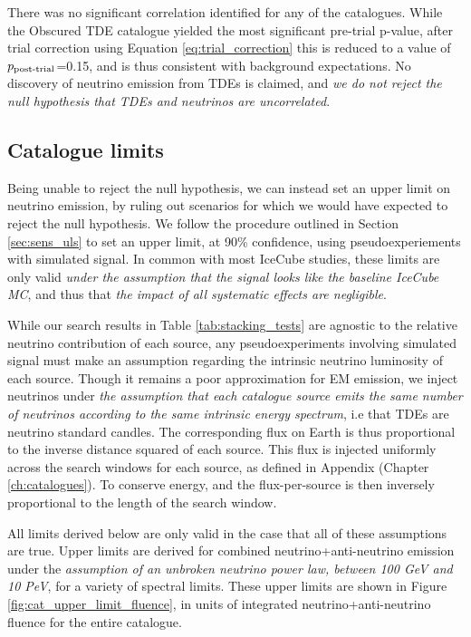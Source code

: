 There was no significant correlation identified for any of the catalogues. While the Obscured TDE catalogue yielded the most significant pre-trial p-value, after trial correction using Equation \ref{eq:trial_correction} this is reduced to a value of $p_{\textup{post-trial}}$=0.15, and is thus consistent with background expectations. No discovery of neutrino emission from TDEs is claimed, and \emph{we do not reject the null hypothesis that TDEs and neutrinos are uncorrelated}.

\subsection*{Catalogue limits}

Being unable to reject the null hypothesis, we can instead set an upper limit on neutrino emission, by ruling out scenarios for which we would have expected to reject the null hypothesis. We follow the procedure outlined in Section \ref{sec:sens_uls} to set an upper limit, at 90\% confidence, using pseudoexperiements with simulated signal. In common with most IceCube studies, these limits are only valid \emph{under the assumption that the signal looks like the baseline IceCube MC}, and thus that \emph{the impact of all systematic effects are negligible}.

While our search results in Table \ref{tab:stacking_tests} are agnostic to the relative neutrino contribution of each source, any pseudoexperiments involving simulated signal must make an assumption regarding the intrinsic neutrino luminosity of each source. Though it remains a poor approximation for EM emission, we inject neutrinos under \emph{the assumption that each catalogue source emits the same number of neutrinos according to the same intrinsic energy spectrum}, i.e that TDEs are neutrino standard candles. The corresponding flux on Earth is thus proportional to the inverse distance squared of each source. This flux is injected uniformly across the search windows for each source, as defined in Appendix (Chapter \ref{ch:catalogues}). To conserve energy, and the flux-per-source is then inversely proportional to the length of the search window. 

All limits derived below are only valid in the case that all of these assumptions are true. Upper limits are derived for combined neutrino+anti-neutrino emission under the \emph{assumption of an unbroken neutrino power law, between 100 GeV and 10 PeV}, for a variety of spectral limits. These upper limits are shown in Figure \ref{fig:cat_upper_limit_fluence}, in units of integrated neutrino+anti-neutrino fluence for the entire catalogue. 

